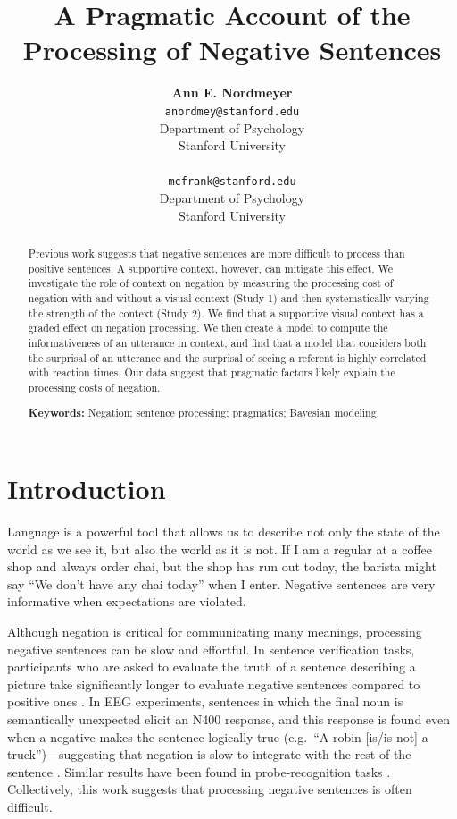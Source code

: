 \documentclass[10pt,letterpaper]{article}
\title{A Pragmatic Account of the Processing of Negative Sentences}
\author{{\large \bf Ann E. Nordmeyer} \\ \texttt{anordmey@stanford.edu}\\ Department of Psychology \\ Stanford University \\ 
\And {\large \bf Michael C. Frank} \\ \texttt{mcfrank@stanford.edu} \\ Department of Psychology \\ Stanford University \\ }
\begin{document}
\maketitle

\begin{abstract}

Previous work suggests that negative sentences are more difficult to process than positive sentences. A supportive context, however, can mitigate this effect.  We investigate the role of context on negation by measuring the processing cost of negation with and without a visual context (Study 1) and then systematically varying the strength of the context (Study 2).  We find that a supportive visual context has a graded effect on negation processing.  We then create a model to compute the informativeness of an utterance in context, and find that a model that considers both the surprisal of an utterance and the surprisal of seeing a referent is highly correlated with reaction times.  Our data suggest that pragmatic factors likely explain the processing costs of negation.  

\textbf{Keywords:} 
Negation; sentence processing; pragmatics; Bayesian modeling.
\end{abstract}

\section{Introduction}

Language is a powerful tool that allows us to describe not only the state of the world as we see it, but also the world as it is not.  If I am a regular at a coffee shop and always order chai, but the shop has run out today, the barista might say ``We don't have any chai today'' when I enter.  Negative sentences are very informative when expectations are violated.

Although negation is critical for communicating many meanings, processing negative sentences can be slow and effortful.  In sentence verification tasks, participants who are asked to evaluate the truth of a sentence describing a picture take significantly longer to evaluate negative sentences compared to positive ones \cite{hclark1972, carpenter1975, just1971, just1976}. In EEG experiments, sentences in which the final noun is semantically unexpected elicit an N400 response, and this response is found even when a negative makes the sentence logically true (e.g.\ ``A robin [is/is not] a truck'')---suggesting that negation is slow to integrate with the rest of the sentence \cite{fischler1983, ludtke2008}.  Similar results have been found in probe-recognition tasks \cite{kaup2003, kaup2006, hasson2006}.  Collectively, this work suggests that processing negative sentences is often difficult.
 
\end{document}
